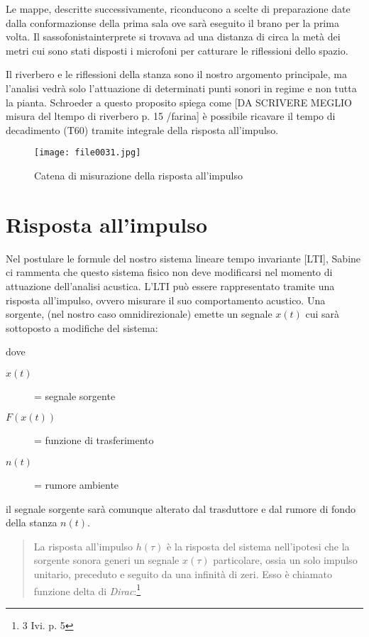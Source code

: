 Le mappe, descritte successivamente, riconducono a scelte di preparazione date dalla conformazionse della
prima sala ove sarà eseguito il brano per la prima volta. Il sassofonistainterprete si trovava ad una
distanza di circa la metà dei metri cui sono stati disposti i microfoni per catturare le  riflessioni dello spazio.	

Il riverbero e le riflessioni della stanza sono il nostro argomento principale, ma l'analisi vedrà solo
l'attuazione di determinati punti sonori in regime e non tutta la pianta.
Schroeder a questo proposito spiega come [DA SCRIVERE MEGLIO misura del ltempo di riverbero p. 15 /farina]
è possibile ricavare il tempo di decadimento (T60) tramite integrale della risposta all'impulso.

\begin{figure}
\centering
{\texttt{[image: file0031.jpg]}}
\caption[Pianta S. Luca]{Catena di misurazione della risposta all'impulso}
\label{fig:tetratetra}
\end{figure}

\section{Risposta all'impulso}

Nel postulare le formule del nostro sistema lineare tempo invariante [LTI], Sabine ci rammenta
che questo sistema fisico  non deve  modificarsi nel momento di attuazione dell'analisi acustica.
L'LTI può essere rappresentato tramite una risposta all'impulso, ovvero misurare il suo
comportamento acustico.  Una sorgente, (nel nostro caso omnidirezionale) emette un
segnale $x(t)$  cui sarà sottoposto a modifiche del sistema:

dove

\begin{description}
	\item[$x(t)$] = segnale sorgente 
	\item[$F(x(t))$] = funzione di trasferimento
	\item[$n(t)$] = rumore ambiente
\end{description}

il segnale sorgente sarà comunque alterato dal trasduttore e dal rumore di fondo della stanza $n(t)$.

\begin{quote}

La risposta all'impulso $h(\tau)$ è la risposta del sistema nell'ipotesi che la
sorgente sonora generi un segnale $x(\tau)$ particolare, ossia un solo impulso unitario,
preceduto e seguito da una infinità di zeri. Esso è chiamato funzione delta di \emph{Dirac}:\footnote{3 Ivi. p. 5} 

\end{quote}

